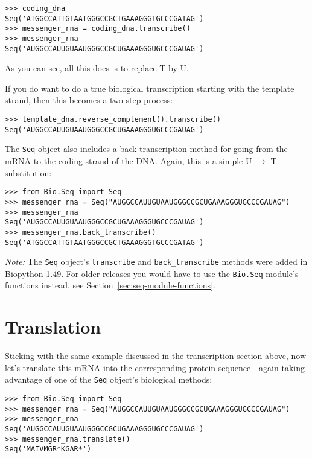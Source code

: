 \begin{verbatim}
>>> coding_dna
Seq('ATGGCCATTGTAATGGGCCGCTGAAAGGGTGCCCGATAG')
>>> messenger_rna = coding_dna.transcribe()
>>> messenger_rna
Seq('AUGGCCAUUGUAAUGGGCCGCUGAAAGGGUGCCCGAUAG')
\end{verbatim}
\noindent As you can see, all this does is to replace T by U.

If you do want to do a true biological transcription starting with the template strand, then this becomes a two-step process:

\begin{verbatim}
>>> template_dna.reverse_complement().transcribe()
Seq('AUGGCCAUUGUAAUGGGCCGCUGAAAGGGUGCCCGAUAG')
\end{verbatim}

The \verb|Seq| object also includes a back-transcription method for going from the mRNA to the coding strand of the DNA.  Again, this is a simple U $\rightarrow$ T substitution:

\begin{verbatim}
>>> from Bio.Seq import Seq
>>> messenger_rna = Seq("AUGGCCAUUGUAAUGGGCCGCUGAAAGGGUGCCCGAUAG")
>>> messenger_rna
Seq('AUGGCCAUUGUAAUGGGCCGCUGAAAGGGUGCCCGAUAG')
>>> messenger_rna.back_transcribe()
Seq('ATGGCCATTGTAATGGGCCGCTGAAAGGGTGCCCGATAG')
\end{verbatim}

\emph{Note:} The \verb|Seq| object's \verb|transcribe| and \verb|back_transcribe| methods
were added in Biopython 1.49.  For older releases you would have to use the \verb|Bio.Seq|
module's functions instead, see Section~\ref{sec:seq-module-functions}.

\section{Translation}
\label{sec:translation}
Sticking with the same example discussed in the transcription section above,
now let's translate this mRNA into the corresponding protein sequence - again taking
advantage of one of the \verb|Seq| object's biological methods:

\begin{verbatim}
>>> from Bio.Seq import Seq
>>> messenger_rna = Seq("AUGGCCAUUGUAAUGGGCCGCUGAAAGGGUGCCCGAUAG")
>>> messenger_rna
Seq('AUGGCCAUUGUAAUGGGCCGCUGAAAGGGUGCCCGAUAG')
>>> messenger_rna.translate()
Seq('MAIVMGR*KGAR*')
\end{verbatim}

